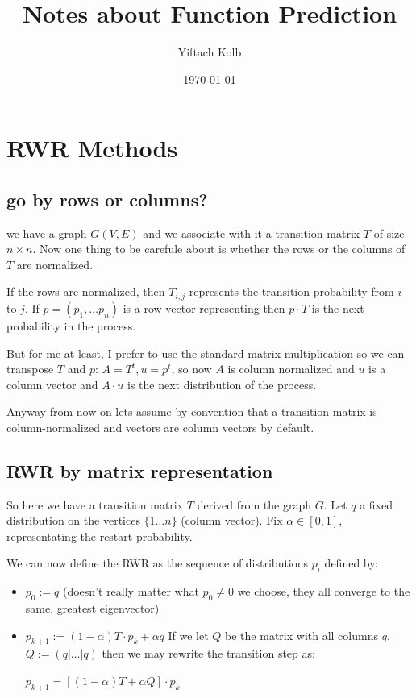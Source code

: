 \documentclass[10pt]{article}
\theoremstyle{definition}
\theoremstyle{remark}
\theoremstyle{plain}
\begin{document}
\renewcommand{\thesubsection}{\thesection.\alph{subsection}}\renewcommand{\thesubsection}{\thesection.\alph{subsection}}


\begin{titlepage}
    \title{Notes about Function Prediction}
    \author{Yiftach Kolb}
    \date{\today}
\end{titlepage}

\maketitle

\section{RWR Methods}

\subsection{go by rows or columns?}
we have a graph $G(V,E)$ and we associate with it a transition
matrix $T$ of size $n \times n$. Now one thing to be carefule about is whether the rows
or the columns of $T$ are normalized.

If the rows are normalized, then $T_{i,j}$ represents the transition
probability from $i$ to $j$. If $p = (p_1, \dots p_n)$ is a row
vector representing then $p \cdot T$ is the next probability in the 
process.

But for me at least, I prefer to use the standard matrix
multiplication so we can transpose $T$ and $p$:  $A = T^{t}, u =
p^{t}$, so now $A$ is column normalized and $u$ is a column vector
and $A \cdot u$ is the next distribution of the process.

Anyway from now on lets assume by convention that a transition
matrix is column-normalized and vectors are column vectors by
default.


\subsection{RWR by matrix representation}
So here we have a transition matrix $T$ derived from the graph $G$.
Let $q$ a fixed
distribution on the vertices  $\{1 \dots n\}$ (column vector).
Fix $\alpha \in [0,1]$, representating the restart probability.

We can now define the RWR as the sequence of distributions $p_i$ defined
by:
\begin{itemize}
\label{def:RWR}
\item{} $p_0 := q$ (doesn't really matter what $p_0 \neq 0$ we
choose, they all converge to the same, greatest eigenvector)
\item{} $p_{k+1} := (1 - \alpha) T \cdot p_k + \alpha q$
\subitem{} 
If we let $Q$ be the matrix with all
columns $q$, $Q := (q | \dots | q)$ then we may rewrite the
transition step as:

$p_{k+1} = 
[(1-\alpha) T + \alpha Q] \cdot p_k$
\end{itemize}
\end{document}
